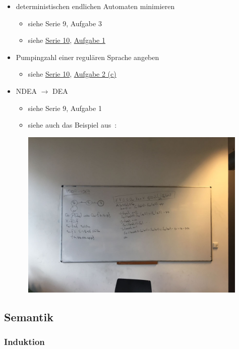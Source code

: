 \documentclass[
  a4paper,
  11pt,
]{scrartcl}
\begin{document}
\begin{itemize}
\begin{itemize}
    \end{itemize}
  \item deterministischen endlichen Automaten minimieren
    \begin{itemize}
      \item siehe Serie 9, Aufgabe 3
      \item siehe \hyperref[sub:serie_10]{Serie 10},
        \hyperref[kfs_serie_10_aufgabe_1]{Aufgabe 1}
    \end{itemize}
  \item Pumpingzahl einer regulären Sprache angeben
    \begin{itemize}
      \item siehe \hyperref[sub:serie_10]{Serie 10},
        \hyperref[kfs_serie_10_aufgabe_2_c]{Aufgabe 2 (c)}
    \end{itemize}
  \item NDEA $\rightarrow$ DEA
    \begin{itemize}
      \item siehe Serie 9, Aufgabe 1
      \item siehe auch das Beispiel aus~\cite{hopcroft2011}:

        \includegraphics[width=0.9\textwidth]{bilder/ndea_zu_dea_bsp_aus_hopcroft.jpg}
    \end{itemize}
\end{itemize}

\subsection{Semantik}
\label{sub:themen_inhalte_semantik}

\subsubsection{Induktion}
\label{ssub:Induktion}
\end{document}
